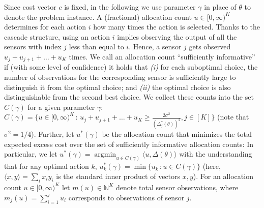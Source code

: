\documentclass[11pt]{article} %
\newcommand{\N}{\mathbb{N}}
\DeclareMathOperator{\argmin}{argmin}
\newcommand{\ip}[1]{\langle #1 \rangle} %
\begin{document}
Since cost vector $c$ is fixed, in the following we use parameter $\gamma$ in place of $\theta$ to denote the problem instance.
A (fractional) allocation count $u\in [0,\infty)^K$ determines for each action $i$ how many times the
action is selected.
Thanks to the cascade structure, using an action $i$ implies observing the output of all the sensors with index $j$ less than equal to $i$. Hence, a sensor $j$ gets observed $u_j+u_{j+1}+\dots+u_K$ times.
We call an allocation count ``sufficiently informative'' if (with some level of confidence)
it holds that {\em (i)} for each suboptimal choice, 
the number of observations for the corresponding sensor is sufficiently large to distinguish
it from the optimal choice; and  {\em (ii)}  the optimal choice is also distinguishable from the second best choice.
We collect these counts into the set $C(\gamma)$ for a given parameter $\gamma$:
$C(\gamma) = \{ u\in [0,\infty)^K\,:\, 
u_j+u_{j+1}+\dots+u_K
\ge \frac{2\sigma^2}{(\Delta_j^*(\theta))^2}, j\in [K] \}$
(note that $\sigma^2=1/4$).
Further, let $u^*(\gamma)$
be the allocation count that minimizes the total expected excess cost over the set of sufficiently informative allocation counts:
In particular,  we let $u^*(\gamma) = \argmin_{u\in C(\gamma)} \ip{ u, \Delta(\theta) }$ 
with the understanding that for any optimal action $k$, $u_k^*(\gamma) = \min \{ u_k \,: u\in C(\gamma) \}$ (here, $\ip{x,y} = \sum_i x_i y_i$ is the standard inner product of vectors $x,y$).
For an allocation count $u\in [0,\infty)^K$ let $m(u)\in \N^K$ denote total sensor observations, where $m_j(u) = \sum_{i=1}^j u_i$ corresponds to observations of sensor $j$.
\end{document}
